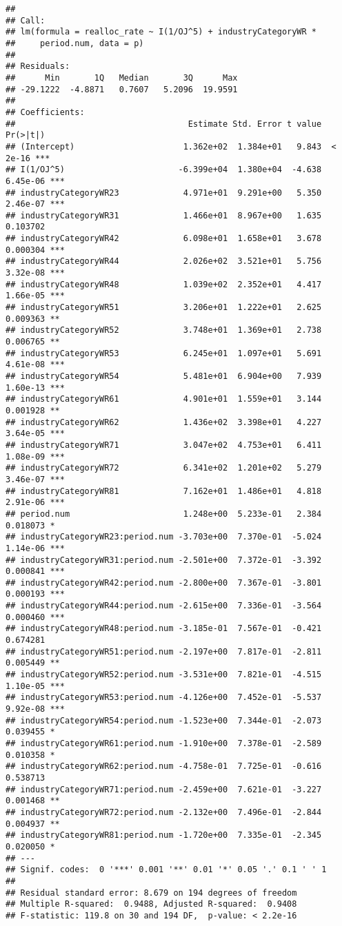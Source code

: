 \documentclass[
]{article}
\begin{document}
\begin{verbatim}
## 
## Call:
## lm(formula = realloc_rate ~ I(1/OJ^5) + industryCategoryWR * 
##     period.num, data = p)
## 
## Residuals:
##      Min       1Q   Median       3Q      Max 
## -29.1222  -4.8871   0.7607   5.2096  19.9591 
## 
## Coefficients:
##                                   Estimate Std. Error t value Pr(>|t|)    
## (Intercept)                      1.362e+02  1.384e+01   9.843  < 2e-16 ***
## I(1/OJ^5)                       -6.399e+04  1.380e+04  -4.638 6.45e-06 ***
## industryCategoryWR23             4.971e+01  9.291e+00   5.350 2.46e-07 ***
## industryCategoryWR31             1.466e+01  8.967e+00   1.635 0.103702    
## industryCategoryWR42             6.098e+01  1.658e+01   3.678 0.000304 ***
## industryCategoryWR44             2.026e+02  3.521e+01   5.756 3.32e-08 ***
## industryCategoryWR48             1.039e+02  2.352e+01   4.417 1.66e-05 ***
## industryCategoryWR51             3.206e+01  1.222e+01   2.625 0.009363 ** 
## industryCategoryWR52             3.748e+01  1.369e+01   2.738 0.006765 ** 
## industryCategoryWR53             6.245e+01  1.097e+01   5.691 4.61e-08 ***
## industryCategoryWR54             5.481e+01  6.904e+00   7.939 1.60e-13 ***
## industryCategoryWR61             4.901e+01  1.559e+01   3.144 0.001928 ** 
## industryCategoryWR62             1.436e+02  3.398e+01   4.227 3.64e-05 ***
## industryCategoryWR71             3.047e+02  4.753e+01   6.411 1.08e-09 ***
## industryCategoryWR72             6.341e+02  1.201e+02   5.279 3.46e-07 ***
## industryCategoryWR81             7.162e+01  1.486e+01   4.818 2.91e-06 ***
## period.num                       1.248e+00  5.233e-01   2.384 0.018073 *  
## industryCategoryWR23:period.num -3.703e+00  7.370e-01  -5.024 1.14e-06 ***
## industryCategoryWR31:period.num -2.501e+00  7.372e-01  -3.392 0.000841 ***
## industryCategoryWR42:period.num -2.800e+00  7.367e-01  -3.801 0.000193 ***
## industryCategoryWR44:period.num -2.615e+00  7.336e-01  -3.564 0.000460 ***
## industryCategoryWR48:period.num -3.185e-01  7.567e-01  -0.421 0.674281    
## industryCategoryWR51:period.num -2.197e+00  7.817e-01  -2.811 0.005449 ** 
## industryCategoryWR52:period.num -3.531e+00  7.821e-01  -4.515 1.10e-05 ***
## industryCategoryWR53:period.num -4.126e+00  7.452e-01  -5.537 9.92e-08 ***
## industryCategoryWR54:period.num -1.523e+00  7.344e-01  -2.073 0.039455 *  
## industryCategoryWR61:period.num -1.910e+00  7.378e-01  -2.589 0.010358 *  
## industryCategoryWR62:period.num -4.758e-01  7.725e-01  -0.616 0.538713    
## industryCategoryWR71:period.num -2.459e+00  7.621e-01  -3.227 0.001468 ** 
## industryCategoryWR72:period.num -2.132e+00  7.496e-01  -2.844 0.004937 ** 
## industryCategoryWR81:period.num -1.720e+00  7.335e-01  -2.345 0.020050 *  
## ---
## Signif. codes:  0 '***' 0.001 '**' 0.01 '*' 0.05 '.' 0.1 ' ' 1
## 
## Residual standard error: 8.679 on 194 degrees of freedom
## Multiple R-squared:  0.9488, Adjusted R-squared:  0.9408 
## F-statistic: 119.8 on 30 and 194 DF,  p-value: < 2.2e-16
\end{verbatim}
\end{document}
